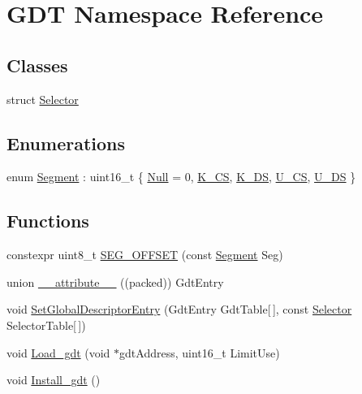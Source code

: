 \hypertarget{namespace_g_d_t}{}\section{G\+DT Namespace Reference}
\label{namespace_g_d_t}
\subsection*{Classes}
\begin{DoxyCompactItemize}
\item 
struct \hyperlink{struct_g_d_t_1_1_selector}{Selector}
\end{DoxyCompactItemize}
\subsection*{Enumerations}
\begin{DoxyCompactItemize}
\item 
enum \hyperlink{namespace_g_d_t_af2b09941ee46a489ebaccfed5c839154}{Segment} \+: uint16\+\_\+t \{ \newline
\hyperlink{namespace_g_d_t_af2b09941ee46a489ebaccfed5c839154a86e32c8df1a16bdd2971d97063048cff}{Null} = 0, 
\hyperlink{namespace_g_d_t_af2b09941ee46a489ebaccfed5c839154a9ec147ba7f4244a0e047c92f24a920b9}{K\+\_\+\+CS}, 
\hyperlink{namespace_g_d_t_af2b09941ee46a489ebaccfed5c839154a71647052ea8761e0f719dfb481a72f0b}{K\+\_\+\+DS}, 
\hyperlink{namespace_g_d_t_af2b09941ee46a489ebaccfed5c839154a1d5e8e72d040439207b2341afb78e530}{U\+\_\+\+CS}, 
\newline
\hyperlink{namespace_g_d_t_af2b09941ee46a489ebaccfed5c839154a62f547535bd854846bc3d457a3f37eeb}{U\+\_\+\+DS}
 \}
\end{DoxyCompactItemize}
\subsection*{Functions}
\begin{DoxyCompactItemize}
\item 
constexpr uint8\+\_\+t \hyperlink{namespace_g_d_t_a3f6672477fedb061897f9c710f539ccb}{S\+E\+G\+\_\+\+O\+F\+F\+S\+ET} (const \hyperlink{namespace_g_d_t_af2b09941ee46a489ebaccfed5c839154}{Segment} Seg)
\item 
union \hyperlink{namespace_g_d_t_aafeef73468f65116a440104dd6359e4c}{\+\_\+\+\_\+attribute\+\_\+\+\_\+} ((packed)) Gdt\+Entry
\item 
void \hyperlink{namespace_g_d_t_a5d0041eb890e6c1f40d8a919494c2354}{Set\+Global\+Descriptor\+Entry} (Gdt\+Entry Gdt\+Table\mbox{[}$\,$\mbox{]}, const \hyperlink{struct_g_d_t_1_1_selector}{Selector} Selector\+Table\mbox{[}$\,$\mbox{]})
\item 
void \hyperlink{namespace_g_d_t_a3660563d28e3bab08ddac58ca6844b58}{Load\+\_\+gdt} (void $\ast$gdt\+Address, uint16\+\_\+t Limit\+Use)
\item 
void \hyperlink{namespace_g_d_t_a174feb7c5a037cc991bf4eb27c256366}{Install\+\_\+gdt} ()
\end{DoxyCompactItemize}
